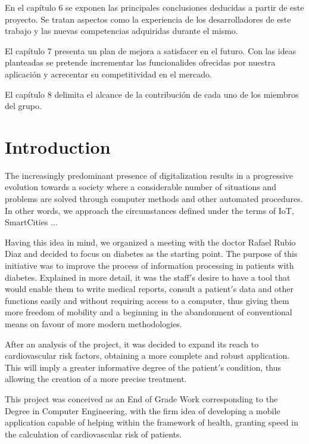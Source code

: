 \documentclass[11pt,spanish,
		listoftables,listoffigures]
		{tfgplantilla}
\begin{document}
En el capítulo 6 se exponen las principales conclusiones deducidas a partir de este proyecto. Se tratan aspectos como la experiencia de los desarrolladores de este trabajo y las nuevas competencias adquiridas durante el mismo.

El capítulo 7 presenta un plan de mejora a satisfacer en el futuro. Con las ideas planteadas se pretende incrementar las funcionalides ofrecidas por nuestra aplicación y acrecentar su competitividad en el mercado.

El capítulo 8 delimita el alcance de la contribución de cada uno de los miembros del grupo.


\addtocounter{chapter}{-1}
\chapter{Introduction}

The increasingly predominant presence of digitalization results in a progressive evolution towards a society where a considerable number of situations and problems are solved through computer methods and other automated procedures. In other words, we approach the circumstances defined under the terms of IoT, SmartCities ...

Having this idea in mind, we organized a meeting with the doctor Rafael Rubio Diaz and decided to focus on diabetes as the starting point. The purpose of this initiative was to improve the process of information processing in patients with diabetes. Explained in more detail, it was the staff$'$s desire to have a tool that would enable them to write medical reports, consult a patient$'$s data and other functions easily and without requiring access to a computer, thus giving them more freedom of mobility and a beginning in the abandonment of conventional means on favour of more modern methodologies.

After an analysis of the project, it was decided to expand its reach to cardiovascular risk factors, obtaining a more complete and robust application. This will imply a greater informative degree of the patient$'$s condition, thus allowing the creation of a more precise treatment.

This project was conceived as an End of Grade Work corresponding to the Degree in Computer Engineering, with the firm idea of developing a mobile application capable of helping within the framework of health, granting speed in the calculation of cardiovascular risk of patients.
\end{document}
